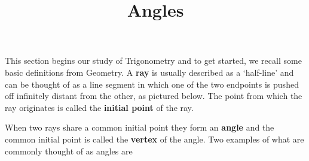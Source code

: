 \documentclass[12pt]{ximera}
\title{Angles}
\begin{document}
\maketitle

\setcounter{footnote}{0}

\label{Angles}

This section begins our study of Trigonometry and to get started, we recall some basic definitions from Geometry.  A  \textbf{ray} is usually described as a `half-line' and can be thought of as a line segment in which one of the two endpoints is pushed off infinitely distant from the other, as pictured below.  The point from which the ray originates is called the  \textbf{initial point} of the ray.

\begin{center}



\end{center}

When two rays share a common initial point they form an  \textbf{angle} and the common initial point is called the \textbf{vertex} of the angle.  Two  examples of what are commonly thought of as angles are

\[ \begin{array}{cc}

  

&

\hspace{1.75in}

   \\ \end{array} \]
\end{document}
